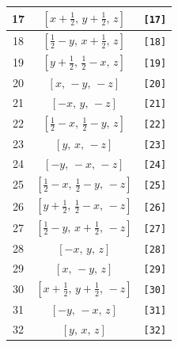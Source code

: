 \documentclass[fleqn,8pt]{jsarticle}
\begin{document}
\begin{longtable}{ccc}
17 & $\left[ x + \frac{1}{2},\, y + \frac{1}{2},\, z \right]$ & {\tt [17]} \\ \hline
18 & $\left[ \frac{1}{2} - y,\, x + \frac{1}{2},\, z \right]$ & {\tt [18]} \\ \hline
19 & $\left[ y + \frac{1}{2},\, \frac{1}{2} - x,\, z \right]$ & {\tt [19]} \\ \hline
20 & $\left[ x,\, - y,\, - z \right]$ & {\tt [20]} \\ \hline
21 & $\left[ - x,\, y,\, - z \right]$ & {\tt [21]} \\ \hline
22 & $\left[ \frac{1}{2} - x,\, \frac{1}{2} - y,\, z \right]$ & {\tt [22]} \\ \hline
23 & $\left[ y,\, x,\, - z \right]$ & {\tt [23]} \\ \hline
24 & $\left[ - y,\, - x,\, - z \right]$ & {\tt [24]} \\ \hline
25 & $\left[ \frac{1}{2} - x,\, \frac{1}{2} - y,\, - z \right]$ & {\tt [25]} \\ \hline
26 & $\left[ y + \frac{1}{2},\, \frac{1}{2} - x,\, - z \right]$ & {\tt [26]} \\ \hline
27 & $\left[ \frac{1}{2} - y,\, x + \frac{1}{2},\, - z \right]$ & {\tt [27]} \\ \hline
28 & $\left[ - x,\, y,\, z \right]$ & {\tt [28]} \\ \hline
29 & $\left[ x,\, - y,\, z \right]$ & {\tt [29]} \\ \hline
30 & $\left[ x + \frac{1}{2},\, y + \frac{1}{2},\, - z \right]$ & {\tt [30]} \\ \hline
31 & $\left[ - y,\, - x,\, z \right]$ & {\tt [31]} \\ \hline
32 & $\left[ y,\, x,\, z \right]$ & {\tt [32]} \\
\end{longtable}
\end{document}

